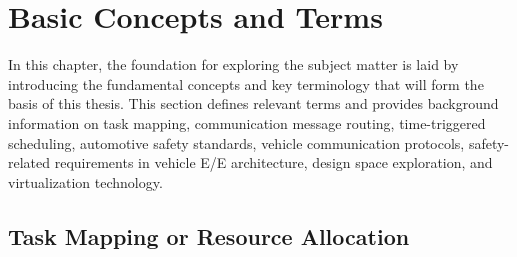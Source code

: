 \chapter{Basic Concepts and Terms}%
\label{basicConcepts}
    In this chapter, the foundation for exploring the subject matter is laid by introducing the fundamental concepts and key terminology that will form the basis of this thesis.
    This section defines relevant terms and provides background information on task mapping, communication message routing, time-triggered scheduling, automotive safety standards, vehicle communication protocols, safety-related requirements in vehicle E/E architecture, design space exploration, and virtualization technology.




\section{Task Mapping or Resource Allocation}

